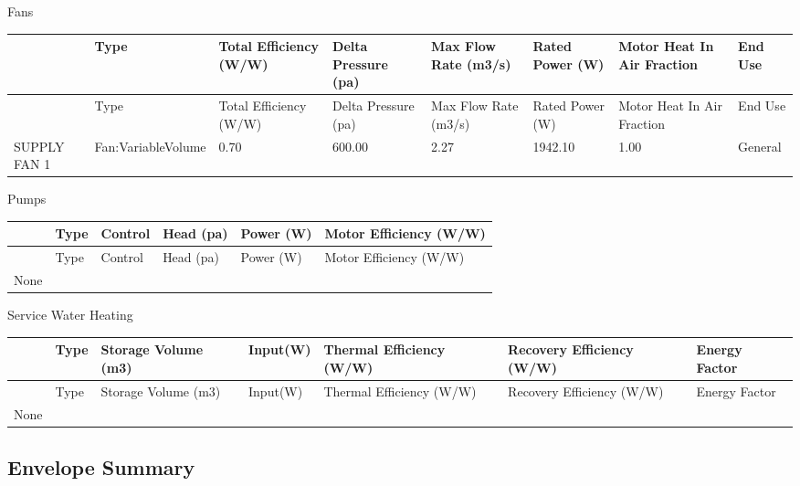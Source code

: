 Fans

{\scriptsize
\begin{longtable}[c]{>{\raggedright}p{0.75in}>{\raggedright}p{0.75in}>{\raggedright}p{0.75in}>{\raggedright}p{0.75in}>{\raggedright}p{0.75in}>{\raggedright}p{0.75in}>{\raggedright}p{0.75in}>{\raggedright}p{0.75in}}
\toprule 
~ & Type & Total Efficiency (W/W) & Delta Pressure (pa) & Max Flow Rate (m3/s) & Rated Power (W) & Motor Heat In Air Fraction & End Use \tabularnewline
\midrule
\endfirsthead

\toprule 
~ & Type & Total Efficiency (W/W) & Delta Pressure (pa) & Max Flow Rate (m3/s) & Rated Power (W) & Motor Heat In Air Fraction & End Use \tabularnewline
\midrule
\endhead

SUPPLY FAN 1 & Fan:\-Variable\-Volume & 0.70 & 600.00 & 2.27 & 1942.10 & 1.00 & General \tabularnewline
\bottomrule
\end{longtable}}

Pumps

\begin{longtable}[c]{@{}llllll@{}}
\toprule 
~ & Type & Control & Head (pa) & Power (W) & Motor Efficiency (W/W) \tabularnewline
\midrule
\endfirsthead

\toprule 
~ & Type & Control & Head (pa) & Power (W) & Motor Efficiency (W/W) \tabularnewline
\midrule
\endhead

None & ~ & ~ & ~ & ~ & ~ \tabularnewline
\bottomrule
\end{longtable}

Service Water Heating

\begin{longtable}[c]{>{\raggedright}p{0.85in}>{\raggedright}p{0.85in}>{\raggedright}p{0.85in}>{\raggedright}p{0.85in}>{\raggedright}p{0.85in}>{\raggedright}p{0.85in}>{\raggedright}p{0.85in}}
\toprule 
~ & Type & Storage Volume (m3) & Input(W) & Thermal Efficiency (W/W) & Recovery Efficiency (W/W) & Energy Factor \tabularnewline
\midrule
\endfirsthead

\toprule 
~ & Type & Storage Volume (m3) & Input(W) & Thermal Efficiency (W/W) & Recovery Efficiency (W/W) & Energy Factor \tabularnewline
\midrule
\endhead

None & ~ & ~ & ~ & ~ & ~ & ~ \tabularnewline
\bottomrule
\end{longtable}

\subsection{Envelope Summary}\label{envelope-summary}

